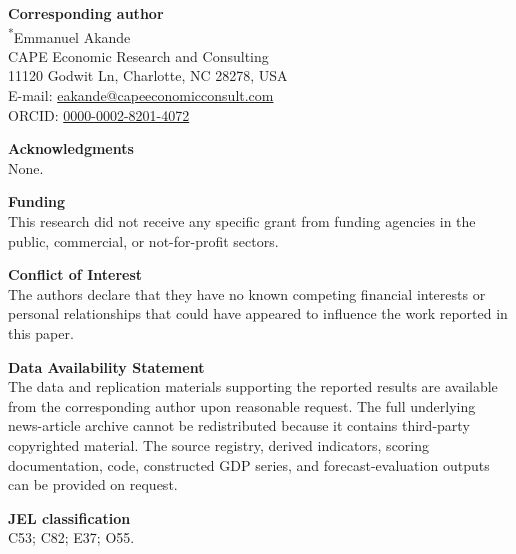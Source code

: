 \documentclass[12pt]{article}
\begin{document}
\textbf{Corresponding author}\\
\textsuperscript{*}Emmanuel Akande\\
CAPE Economic Research and Consulting\\
11120 Godwit Ln, Charlotte, NC 28278, USA\\
E-mail: \href{mailto:eakande@capeeconomicconsult.com}{eakande@capeeconomicconsult.com}\\
ORCID: \href{https://orcid.org/0000-0002-8201-4072}{0000-0002-8201-4072}

\textbf{Acknowledgments}\\
None.

\textbf{Funding}\\
This research did not receive any specific grant from funding agencies in the public, commercial, or not-for-profit sectors.

\textbf{Conflict of Interest}\\
The authors declare that they have no known competing financial interests or personal relationships that could have appeared to influence the work reported in this paper.

\textbf{Data Availability Statement}\\
The data and replication materials supporting the reported results are available from the corresponding author upon reasonable request. The full underlying news-article archive cannot be redistributed because it contains third-party copyrighted material. The source registry, derived indicators, scoring documentation, code, constructed GDP series, and forecast-evaluation outputs can be provided on request.

\textbf{JEL classification}\\
C53; C82; E37; O55.
\end{document}

